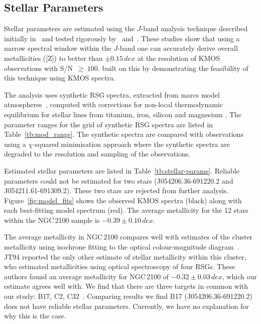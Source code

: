 \documentclass[useAMS,usenatbib]{mn2e}
\begin{document}




\subsection{Stellar Parameters} %
\label{sub:stellar_parameters}

Stellar parameters are estimated using the $J$-band analysis technique described initially in~\cite{2010MNRAS.407.1203D}
and tested rigorously by~\cite{2014ApJ...788...58G} and~\cite{2015ApJ...806...21D}.
These studies show that using a narrow spectral window within the $J$-band one can accurately derive overall metallicities ([Z]) to better than
$\pm0.15\,dex$ at the resolution of KMOS observations with S/N~$\ge~100$.
\cite{2015ApJ...803...14P} built on this by demonstrating the feasibility of this technique using KMOS spectra.

The analysis uses synthetic RSG spectra, extracted from {\sc marcs} model atmospheres~\citep{2008A&A...486..951G},
computed with corrections for non-local thermodynamic equilibrium for stellar lines from titanium, iron, silicon and magnesium
\citep{2012ApJ...751..156B,2013ApJ...764..115B,2015ApJ...804..113B}.
The parameter ranges for the grid of synthetic RSG spectra are listed in Table~\ref{tb:mod_range}.
The synthetic spectra are compared with observations using a $\chi$-squared minimisation approach where the synthetic spectra are degraded to the resolution and sampling of the observations.

Estimated stellar parameters are listed in Table~\ref{tb:stellar-params}.
Reliable parameters could not be estimated for two stars (J054206.36-691220.2 and J054211.61-691309.2).
These two stars are rejected from further analysis.
Figure~\ref{fig:model_fits} shows the observed KMOS spectra (black) along with each best-fitting model spectrum (red).
The average metallicity for the 12 stars within the NGC\,2100 sample is $-0.39\pm0.10\,dex$.

The average metallicity in NGC\,2100 compares well with estimates of the cluster metallicity using isochrone fitting to the optical colour-magnitude diagram~\citep[$-0.34\,dex$;][]{2015A&A...575A..62N}.
JT94 reported the only other estimate of stellar metallicity within this cluster,
who estimated metallicities using optical spectroscopy of four RSGs.
These authors found an average metallicity for NGC\,2100 of $-0.32\pm0.03\,dex$, which our estimate agrees well with.
We find that there are three targets in common with our study: B17, C2, C32~\citep[using the][nomenclature]{1974A&AS...15..261R}.
Comparing results we find B17 (J054206.36-691220.2) does not have reliable stellar parameters. Currently, we have no explanation for why this is the case.
\end{document}
